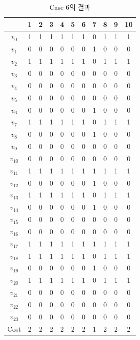 \documentclass{article}
\begin{document}
    \begin{table}[htb!]
    \centering
    \begin{tabular}{c | c c c c c c c c c c}
        \hline
        & 1 & 2 & 3 & 4 & 5 & 6 & 7 & 8 & 9 & 10 \\
        \hline
        $v_0$ & 1 & 1 & 1 & 1 & 1 & 1 & 0 & 1 & 1 & 1 \\
        $v_1$ & 0 & 0 & 0 & 0 & 0 & 0 & 1 & 0 & 0 & 0 \\
        $v_2$ & 1 & 1 & 1 & 1 & 1 & 1 & 0 & 1 & 1 & 1 \\
        $v_3$ & 0 & 0 & 0 & 0 & 0 & 0 & 0 & 0 & 0 & 0 \\
        $v_4$ & 0 & 0 & 0 & 0 & 0 & 0 & 0 & 0 & 0 & 0 \\
        $v_5$ & 0 & 0 & 0 & 0 & 0 & 0 & 0 & 0 & 0 & 0 \\
        $v_6$ & 0 & 0 & 0 & 0 & 0 & 0 & 1 & 0 & 0 & 0 \\
        $v_7$ & 1 & 1 & 1 & 1 & 1 & 1 & 0 & 1 & 1 & 1 \\
        $v_8$ & 0 & 0 & 0 & 0 & 0 & 0 & 1 & 0 & 0 & 0 \\
        $v_9$ & 0 & 0 & 0 & 0 & 0 & 0 & 0 & 0 & 0 & 0 \\
        $v_{10}$ & 0 & 0 & 0 & 0 & 0 & 0 & 0 & 0 & 0 & 0 \\
        $v_{11}$ & 1 & 1 & 1 & 1 & 1 & 1 & 1 & 1 & 1 & 1 \\
        $v_{12}$ & 0 & 0 & 0 & 0 & 0 & 0 & 1 & 0 & 0 & 0 \\
        $v_{13}$ & 1 & 1 & 1 & 1 & 1 & 1 & 0 & 1 & 1 & 1 \\
        $v_{14}$ & 0 & 0 & 0 & 0 & 0 & 0 & 1 & 0 & 0 & 0 \\
        $v_{15}$ & 0 & 0 & 0 & 0 & 0 & 0 & 0 & 0 & 0 & 0 \\
        $v_{16}$ & 0 & 0 & 0 & 0 & 0 & 0 & 0 & 0 & 0 & 0 \\
        $v_{17}$ & 1 & 1 & 1 & 1 & 1 & 1 & 1 & 1 & 1 & 1 \\
        $v_{18}$ & 1 & 1 & 1 & 1 & 1 & 1 & 0 & 1 & 1 & 1 \\
        $v_{19}$ & 0 & 0 & 0 & 0 & 0 & 0 & 1 & 0 & 0 & 0 \\
        $v_{20}$ & 1 & 1 & 1 & 1 & 1 & 1 & 0 & 1 & 1 & 1 \\
        $v_{21}$ & 0 & 0 & 0 & 0 & 0 & 0 & 0 & 0 & 0 & 0 \\
        $v_{22}$ & 0 & 0 & 0 & 0 & 0 & 0 & 0 & 0 & 0 & 0 \\
        $v_{23}$ & 0 & 0 & 0 & 0 & 0 & 0 & 0 & 0 & 0 & 0 \\
        \hline
        Cost & 2 & 2 & 2 & 2 & 2 & 2 & 1 & 2 & 2 & 2 \\
        \hline
    \end{tabular}
    \caption{Case 6의 결과}
    \label{tab:result6}
    \end{table}
\end{document}
